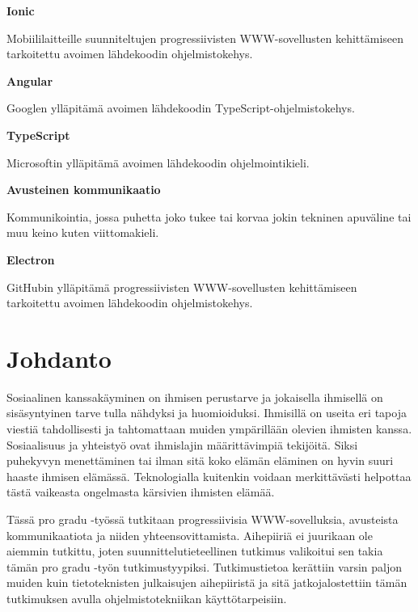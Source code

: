 \documentclass[utf8]{gradu3}
\begin{document}
\begin{thetermlist}
\item[\textbf{Ionic}] 

Mobiililaitteille suunniteltujen progressiivisten WWW-sovellusten kehittämiseen tarkoitettu avoimen lähdekoodin ohjelmistokehys.

\item[\textbf{Angular}] 

Googlen ylläpitämä avoimen lähdekoodin TypeScript-ohjelmistokehys.

\item[\textbf{TypeScript}] 

Microsoftin ylläpitämä avoimen lähdekoodin ohjelmointikieli.

\item[\textbf{Avusteinen kommunikaatio}]

 Kommunikointia, jossa puhetta joko tukee tai korvaa jokin tekninen apuväline tai muu keino kuten viittomakieli.

\item[\textbf{Electron}] 

GitHubin ylläpitämä progressiivisten WWW-sovellusten kehittämiseen tarkoitettu avoimen lähdekoodin ohjelmistokehys.

\end{thetermlist}

\mainmatter

\chapter{Johdanto}

Sosiaalinen kanssakäyminen on ihmisen perustarve ja jokaisella ihmisellä on sisäsyntyinen tarve tulla nähdyksi ja huomioiduksi. Ihmisillä on useita eri tapoja viestiä tahdollisesti ja tahtomattaan muiden ympärillään olevien ihmisten kanssa. Sosiaalisuus ja yhteistyö ovat ihmislajin määrittävimpiä tekijöitä. Siksi puhekyvyn menettäminen tai ilman sitä koko elämän eläminen on hyvin suuri haaste ihmisen elämässä. Teknologialla kuitenkin voidaan merkittävästi helpottaa tästä vaikeasta ongelmasta kärsivien ihmisten elämää.

Tässä pro gradu -työssä tutkitaan progressiivisia WWW-sovelluksia, avusteista kommunikaatiota ja niiden yhteensovittamista. Aihepiiriä ei juurikaan ole aiemmin tutkittu, joten suunnittelutieteellinen tutkimus valikoitui sen takia tämän pro gradu -työn tutkimustyypiksi. Tutkimustietoa kerättiin varsin paljon muiden kuin tietoteknisten julkaisujen aihepiiristä ja sitä jatkojalostettiin tämän tutkimuksen avulla ohjelmistotekniikan käyttötarpeisiin.
\end{document}
